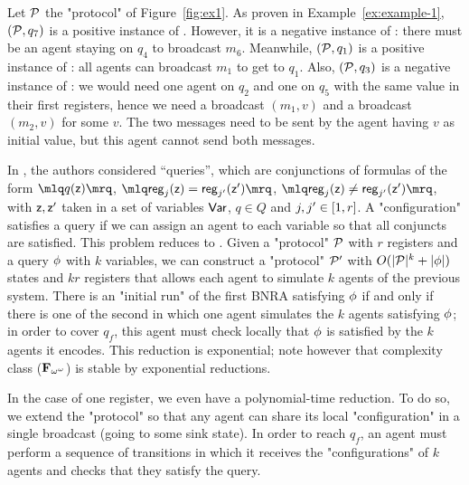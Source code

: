\begin{example}\label{example-2}
	Let $\mathcal{P}$ the "protocol" of Figure~\ref{fig:ex1}. As proven in Example~\ref{ex:example-1}, $(\mathcal{P},q_7)$ is a positive instance of \COVER. However, it is a negative instance of \TARGET: there must be an agent staying on $q_4$ to broadcast $m_6$. Meanwhile, $(\mathcal{P},q_1)$ is a positive instance of \TARGET: all agents can broadcast $m_1$ to get to $q_1$. Also, $(\mathcal{P}, q_3)$ is a negative instance of \COVER: we would need one agent on $q_2$ and one on $q_5$ with the same value in their first registers, hence we need a broadcast $(m_1,v)$ and a broadcast $(m_2,v)$ for some $v$. The two messages need to be sent by the agent having $v$ as initial value, but this agent cannot send both messages.
\end{example}

\begin{remark}
	In \cite{DelzannoST13}, the authors considered ``queries'', which are conjunctions of formulas of the form $\quotemarks{q(\var{z})}$, $\quotemarks{\mathsf{reg}_j(\var{z}) = \mathsf{reg}_{j'}(\var{z}')}$, $\quotemarks{\mathsf{reg}_j(\var{z}) \neq \mathsf{reg}_{j'}(\var{z}')}$, with $\mathsf{z}, \mathsf{z}'$ taken in a set of variables $\mathsf{Var}$, $q\in Q$ and $j,j' \in [1,r]$. A "configuration" satisfies a query if we can assign an agent to each variable so that all conjuncts are satisfied.
	This problem reduces to \COVER.
	Given a "protocol" $\mathcal{P}$ with $r$ registers and a query $\phi$ with $k$ variables, we can construct a "protocol" $\mathcal{P}'$ with $O(|\mathcal{P}|^k + |\phi|)$ states and $kr$ registers that allows each agent to simulate $k$ agents of the previous system.
	There is an "initial run" of the first BNRA satisfying $\phi$ if and only if there is one of the second in which one agent simulates the $k$ agents satisfying $\phi$; in order to cover $q_f$, this agent must check locally that $\phi$ is satisfied by the $k$ agents it encodes.
	This reduction is exponential; note however that complexity class ($\mathbf{F}_{\omega^{\omega}}$) is stable by exponential reductions.
	
	In the case of one register, we even have a polynomial-time reduction. To do so, we extend the "protocol" so that any agent can share its local "configuration" in a single broadcast (going to some sink state).
	In order to reach $q_f$, an agent must perform a sequence of transitions in which it receives the "configurations" of $k$ agents and checks that they satisfy the query.
\end{remark}

